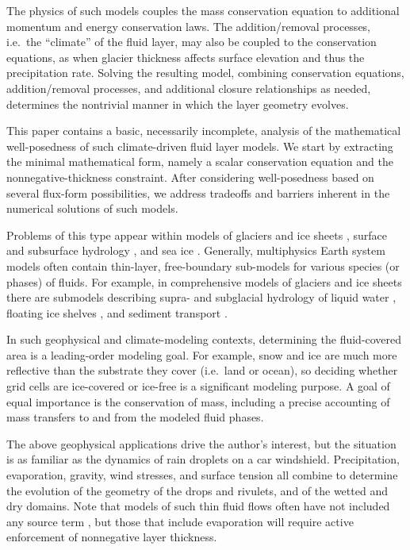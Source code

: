 \documentclass[final,onefignum]{siamart190516}
\begin{document}
The physics of such models couples the mass conservation equation to additional momentum and energy conservation laws.  The addition/removal processes, i.e.~the ``climate'' of the fluid layer, may also be coupled to the conservation equations, as when glacier thickness affects surface elevation and thus the precipitation rate.  Solving the resulting model, combining conservation equations, addition/removal processes, and additional closure relationships as needed, determines the nontrivial manner in which the layer geometry evolves.

This paper contains a basic, necessarily incomplete, analysis of the mathematical well-posedness of such climate-driven fluid layer models.  We start by extracting the minimal mathematical form, namely a scalar conservation equation and the nonnegative-thickness constraint.  After considering well-posedness based on several flux-form possibilities, we address tradeoffs and barriers inherent in the numerical solutions of such models.

Problems of this type appear within models of glaciers and ice sheets \cite{Bueler2016,CalvoDuranyVazquez2000,DiazSchiavi1999,
EgholmNielsen2010,JouvetBueler2012,JouvetBuelerGraeserKornhuber2013}, surface and subsurface hydrology \cite{AlonsoSantillanaDawson2008,Maxwelletal2015}, and sea ice \cite{LipscombHunke2004,Thorndikeetal1975}.  Generally, multiphysics Earth system models often contain thin-layer, free-boundary sub-models for various species (or phases) of fluids.  For example, in comprehensive models of glaciers and ice sheets there are submodels describing supra- and subglacial hydrology of liquid water \cite{Aschwandenetal2012,BuelervanPelt2015,Schoofetal2012}, floating ice shelves \cite{Albrechtetal2011}, and sediment transport \cite{Brinkerhoffetal2017}.

In such geophysical and climate-modeling contexts, determining the fluid-covered area is a leading-order modeling goal.  For example, snow and ice are much more reflective than the substrate they cover (i.e.~land or ocean), so deciding whether grid cells are ice-covered or ice-free is a significant modeling purpose.  A goal of equal importance is the conservation of mass, including a precise accounting of mass transfers to and from the modeled fluid phases.

The above geophysical applications drive the author's interest, but the situation is as familiar as the dynamics of rain droplets on a car windshield.  Precipitation, evaporation, gravity, wind stresses, and surface tension all combine to determine the evolution of the geometry of the drops and rivulets, and of the wetted and dry domains.  Note that models of such thin fluid flows often have not included any source term \cite[for example]{Kondic2003}, but those that include evaporation will require active enforcement of nonnegative layer thickness.
\end{document}
